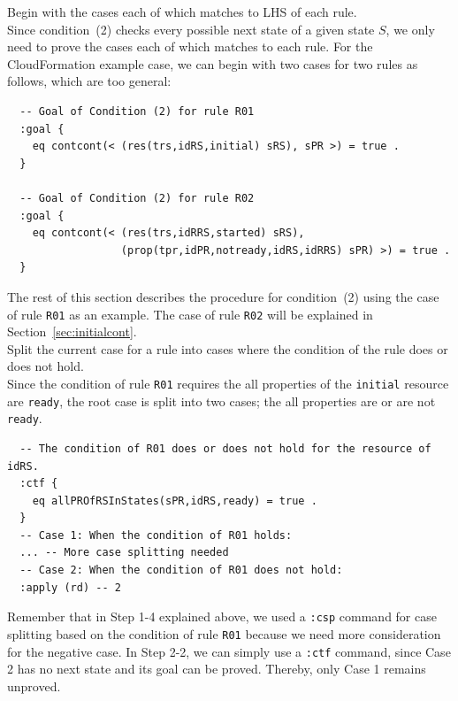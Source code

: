 \documentclass[12pt]{report}
\begin{document}
 Begin with the cases each of which matches to
LHS of each rule. \\
Since condition~(2) checks every possible next state of
a given state $S$\!, we only need to prove the cases each of which
matches to each rule. For the CloudFormation example case, we can
begin with two cases for two rules as follows, which are too general:
\small
\begin{verbatim}
  -- Goal of Condition (2) for rule R01
  :goal {
    eq contcont(< (res(trs,idRS,initial) sRS), sPR >) = true .
  }

  -- Goal of Condition (2) for rule R02
  :goal {
    eq contcont(< (res(trs,idRRS,started) sRS),
                  (prop(tpr,idPR,notready,idRS,idRRS) sPR) >) = true .
  }
\end{verbatim}
\normalsize

The rest of this section describes the procedure for condition~(2)
using the case of rule {\tt R01} as an example. The case of rule {\tt R02} will
be explained in Section~\ref{sec:initialcont}.\\

 Split the current case for a rule into
cases where the condition of the rule does or does not hold. \\
Since the condition of rule {\tt R01} requires the all properties of the
{\tt initial} resource are {\tt ready}, the root case is split into
two cases; the all properties are or are not {\tt ready}.
\small
\begin{verbatim}
  -- The condition of R01 does or does not hold for the resource of idRS.
  :ctf {
    eq allPROfRSInStates(sPR,idRS,ready) = true .
  }
  -- Case 1: When the condition of R01 holds:
  ... -- More case splitting needed
  -- Case 2: When the condition of R01 does not hold:
  :apply (rd) -- 2
\end{verbatim}
\normalsize
Remember that in Step 1-4 explained above, we used a {\tt :csp}
command for case splitting based on the condition of rule {\tt R01}
because we need more consideration for the negative case.  In Step
2-2, we can simply use a {\tt :ctf} command, since Case 2 has no next
state and its goal can be proved. Thereby, only Case 1 remains unproved.\\
\end{document}
